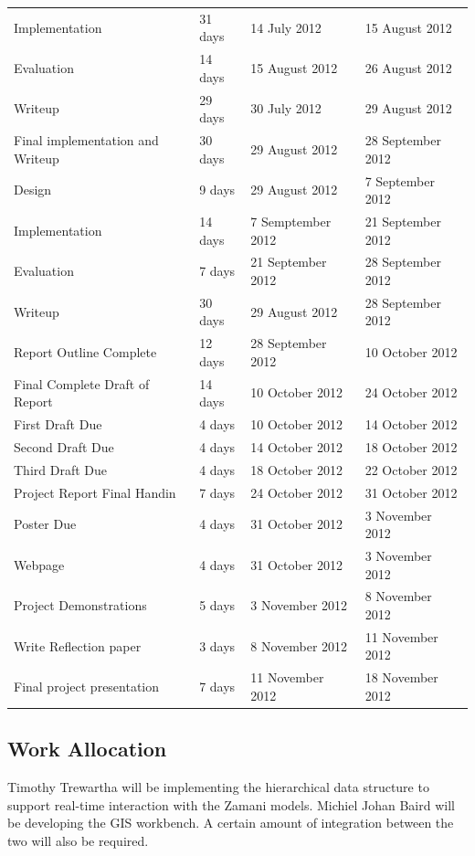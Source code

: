 \documentclass[12pt,a4paper]{article}
\begin{document}
\begin{tabular}{l||l|l|l}
    \indent Implementation & 31 days & 14 July 2012 & 15 August 2012 \\
    \indent Evaluation & 14 days & 15 August 2012 & 26 August 2012  \\
    \indent Writeup & 29 days & 30 July 2012 & 29 August 2012 \\
    \hline
    Final implementation and Writeup & 30 days & 29 August 2012 & 28 September 2012 \\
    \indent Design & 9 days   & 29 August 2012  & 7 September 2012 \\
    \indent Implementation & 14 days & 7 Semptember 2012 & 21 September 2012 \\
    \indent Evaluation & 7 days & 21 September 2012  & 28 September 2012 \\
    \indent Writeup & 30 days & 29 August 2012 & 28 September 2012 \\
    \hline
    Report Outline Complete & 12 days  &28 September 2012 & 10 October 2012 \\
    \hline
    Final Complete Draft of Report & 14 days & 10 October 2012 & 24 October 2012 \\
    \indent First Draft Due & 4 days &10 October 2012 & 14 October 2012 \\
    \indent Second Draft Due & 4 days &14 October 2012 & 18 October 2012 \\
    \indent Third Draft Due & 4 days  &18 October 2012 & 22 October 2012 \\
    \hline
    Project Report Final Handin & 7 days & 24 October 2012 & 31 October 2012 \\
    \hline
    Poster Due & 4 days  & 31 October 2012 & 3 November 2012 \\
    \hline
    Webpage & 4 days & 31 October 2012 & 3 November 2012 \\
    \hline
    Project Demonstrations & 5 days & 3 November 2012 & 8 November 2012 \\
    \hline
    Write Reflection paper &3 days & 8 November 2012 & 11 November 2012 \\
    \hline
    Final project presentation & 7 days &11 November 2012 & 18 November 2012 \\

\end{tabular}

\subsection{Work Allocation}
Timothy Trewartha will be implementing the hierarchical data structure to support
real-time interaction with the Zamani models. Michiel Johan Baird will be developing
the GIS workbench. A certain amount of integration between the two will also be required.






\end{document}
